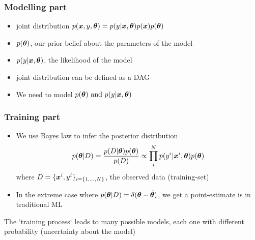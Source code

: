 \begin{frame}
  \frametitle{Modelling part}
  \begin{itemize}
    \item joint distribution \( p(\boldsymbol{x}, y, \boldsymbol{\theta}) = p(y|\boldsymbol{x},\boldsymbol{\theta}) p(\boldsymbol{x}) p(\boldsymbol{\theta}) \)
    \item \( p(\boldsymbol{\theta}) \), our prior belief about the parameters of the model
    \item \( p(y|\boldsymbol{x}, \boldsymbol{\theta})\), the likelihood of the model
    \item joint distribution can be defined as a \alert{DAG}
  \end{itemize}

  \begin{figure}[!h]
\end{figure}

\noindent\makebox[\linewidth]{\rule{\paperwidth}{0.4pt}}
\begin{itemize}
\item We need to model \alert{ \(p(\boldsymbol{\theta}) \text{ and } p(y|\boldsymbol{x}, \boldsymbol{\theta}) \)}
\end{itemize}

\end{frame}


\begin{frame}
  \frametitle{Training part}
  \begin{itemize}
  \item We use Bayes law to infer the posterior distribution
    \begin{equation}
      p(\boldsymbol{\theta}|D) = \frac{p(D|\boldsymbol{\theta})p(\boldsymbol{\theta})}{p(D)} \propto \prod_i^N p(y^i|\boldsymbol{x}^i, \boldsymbol{\theta})p(\boldsymbol{\theta})
    \end{equation}
    where $D = \{\boldsymbol{x}^i, y^i\}_{i=\{1, ..., N\}}$, the observed data (training-set)
    \item In the extreme case where $p(\boldsymbol{\theta}|D) = \delta(\boldsymbol{\theta} - \hat{\boldsymbol{\theta}})$, we get a point-estimate is in traditional ML
    \end{itemize}

    \noindent\makebox[\linewidth]{\rule{\paperwidth}{0.4pt}}
    The `training process` leads to many possible models, each one with different probability (\alert{uncertainty about the model})

\end{frame}

